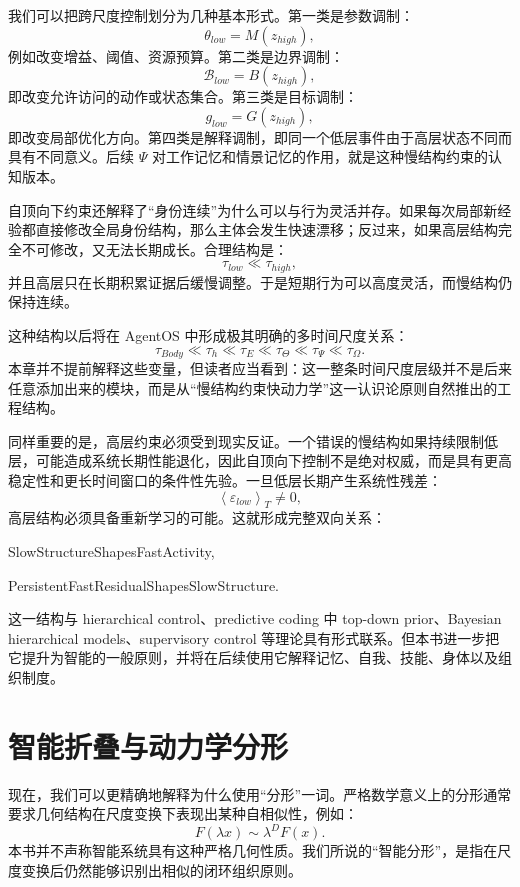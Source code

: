 我们可以把跨尺度控制划分为几种基本形式。第一类是参数调制：
\[
\theta_{low}
=
M(z_{high}),
\]
例如改变增益、阈值、资源预算。第二类是边界调制：
\[
\mathcal B_{low}
=
B(z_{high}),
\]
即改变允许访问的动作或状态集合。第三类是目标调制：
\[
g_{low}
=
G(z_{high}),
\]
即改变局部优化方向。第四类是解释调制，即同一个低层事件由于高层状态不同而具有不同意义。后续 $\Psi$ 对工作记忆和情景记忆的作用，就是这种慢结构约束的认知版本。

自顶向下约束还解释了“身份连续”为什么可以与行为灵活并存。如果每次局部新经验都直接修改全局身份结构，那么主体会发生快速漂移；反过来，如果高层结构完全不可修改，又无法长期成长。合理结构是：
\[
\tau_{low}
\ll
\tau_{high},
\]
并且高层只在长期积累证据后缓慢调整。于是短期行为可以高度灵活，而慢结构仍保持连续。

这种结构以后将在 AgentOS 中形成极其明确的多时间尺度关系：
\[
\tau_{Body}
\ll
\tau_h
\ll
\tau_E
\ll
\tau_\Theta
\ll
\tau_\Psi
\ll
\tau_\Omega.
\]
本章并不提前解释这些变量，但读者应当看到：这一整条时间尺度层级并不是后来任意添加出来的模块，而是从“慢结构约束快动力学”这一认识论原则自然推出的工程结构。

同样重要的是，高层约束必须受到现实反证。一个错误的慢结构如果持续限制低层，可能造成系统长期性能退化，因此自顶向下控制不是绝对权威，而是具有更高稳定性和更长时间窗口的条件性先验。一旦低层长期产生系统性残差：
\[
\left\langle\varepsilon_{low}\right\rangle_T
\neq0,
\]
高层结构必须具备重新学习的可能。这就形成完整双向关系：
\begin{statementbox}
SlowStructureShapesFastActivity,
\end{statementbox}
\begin{statementbox}
PersistentFastResidualShapesSlowStructure.
\end{statementbox}

这一结构与 hierarchical control、predictive coding 中 top-down prior、Bayesian hierarchical models、supervisory control 等理论具有形式联系。但本书进一步把它提升为智能的一般原则，并将在后续使用它解释记忆、自我、技能、身体以及组织制度。

\section{智能折叠与动力学分形}

现在，我们可以更精确地解释为什么使用“分形”一词。严格数学意义上的分形通常要求几何结构在尺度变换下表现出某种自相似性，例如：
\[
F(\lambda x)
\sim
\lambda^D F(x).
\]
本书并不声称智能系统具有这种严格几何性质。我们所说的“智能分形”，是指在尺度变换后仍然能够识别出相似的闭环组织原则。

